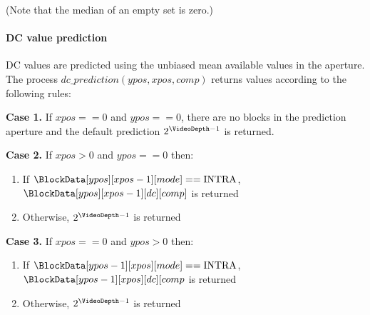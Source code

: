 \begin{pseudo*}
    \bsIF{\BlockData[ypos][xpos-1][global]==\true}
        \bsIF{\BlockData[ypos][xpos-1][mode][ref]==\false}
        \bsEND
    \bsEND
    \bsIF{\BlockData[ypos-1][xpos][global]==\true}
        \bsIF{\BlockData[ypos-1][xpos][mode][ref]==\false}
        \bsEND
    \bsEND
    \bsIF{\BlockData[ypos-1][xpos-1][global]==\false}
        \bsIF{\BlockData[ypos-1][xpos-1][mode][ref]==\true}
        \bsEND
    \bsEND

\bsEND
\end{pseudo*}

(Note that the median of an empty set is zero.)

\paragraph{DC value prediction \\}
\label{dcprediction}

DC values are predicted using the unbiased mean available values in the aperture. The
process $dc\_prediction(ypos, xpos, comp)$ returns values according to
the following rules:

{\bf Case 1.}  If $xpos==0$ and $ypos==0$, there are no blocks in the prediction aperture and
the default prediction $2^{\VideoDepth-1}$ is returned.

{\bf Case 2.} If $xpos>0$ and $ypos==0$ then:
\begin{enumerate}
   \item If $\BlockData[ypos][xpos-1][mode]==\Intra$, $\BlockData[ypos][xpos-1][dc][comp]$ is returned
   \item Otherwise, $2^{\VideoDepth-1}$ is returned
\end{enumerate}

{\bf Case 3.} If $xpos==0$ and $ypos>0$ then:
\begin{enumerate}
   \item If $\BlockData[ypos-1][xpos][mode]==\Intra$, $\BlockData[ypos-1][xpos][dc][comp$ is returned
   \item Otherwise, $2^{\VideoDepth-1}$ is returned
\end{enumerate}

